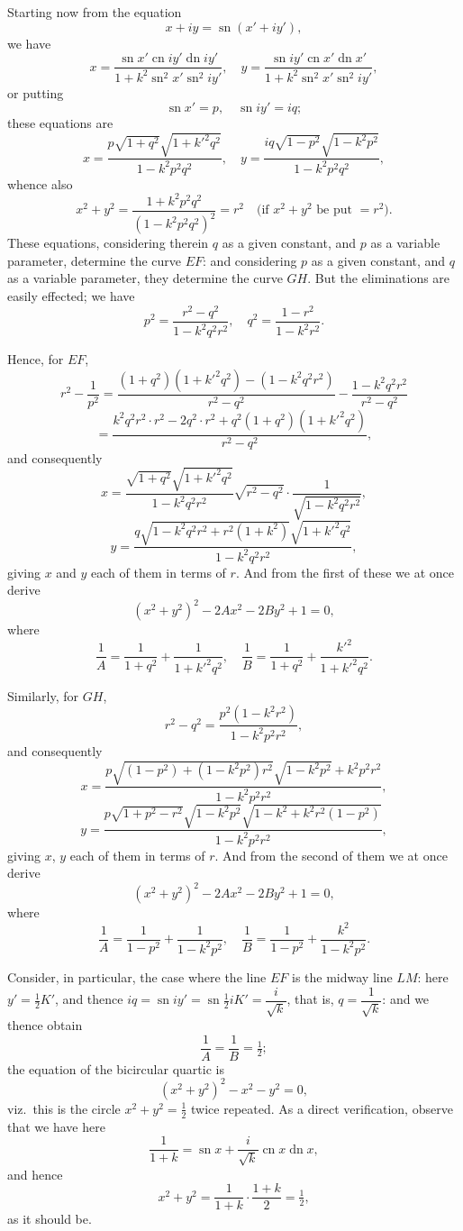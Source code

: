 \documentclass[11pt,a4paper]{article}
\DeclareMathOperator{\sn}{sn}
\DeclareMathOperator{\cn}{cn}
\DeclareMathOperator{\dn}{dn}
\begin{document}
Starting now from the equation
\[
x + iy = \sn(x' + iy'),
\]
we have
\[
x = \frac{\sn x' \cn iy' \dn iy'}{1 + k^2 \sn^2 x' \sn^2 iy'},\quad y = \frac{\sn iy' \cn x' \dn x'}{1 + k^2 \sn^2 x' \sn^2 iy'},
\]
or putting
\[
\sn x' = p,\quad \sn iy' = iq;
\]
these equations are
\[
x = \frac{p\sqrt{1+q^2}\sqrt{1+k'^2q^2}}{1-k^2p^2q^2},\quad y = \frac{iq\sqrt{1-p^2}\sqrt{1-k^2p^2}}{1-k^2p^2q^2},
\]
whence also
\[
x^2 + y^2 = \frac{1+k^2p^2q^2}{(1-k^2p^2q^2)^2} = r^2\quad \text{(if $x^2+y^2$ be put $=r^2$).}
\]
These equations, considering therein $q$ as a given constant, and $p$ as a variable parameter, determine the curve $EF$: and considering $p$ as a given constant, and $q$ as a variable parameter, they determine the curve $GH$. But the eliminations are easily effected; we have
\[
p^2 = \frac{r^2-q^2}{1-k^2q^2r^2},\quad q^2 = \frac{1-r^2}{1-k^2r^2}.
\]

Hence, for $EF$,
\[
r^2 - \frac{1}{p^2} = \frac{(1+q^2)(1+k'^2q^2) - (1-k^2q^2r^2)}{r^2-q^2} - \frac{1-k^2q^2r^2}{r^2-q^2}
\]
\[
= \frac{k^2q^2r^2 \cdot r^2 - 2q^2 \cdot r^2 + q^2(1+q^2)(1+k'^2q^2)}{r^2-q^2},
\]
and consequently
\[
x = \frac{\sqrt{1+q^2}\sqrt{1+k'^2q^2}}{1-k^2q^2r^2}\sqrt{r^2-q^2} \cdot \frac{1}{\sqrt{1-k^2q^2r^2}},
\]
\[
y = \frac{q\sqrt{1-k^2q^2r^2 + r^2(1+k^2)}\sqrt{1+k'^2q^2}}{1-k^2q^2r^2},
\]
giving $x$ and $y$ each of them in terms of $r$. And from the first of these we at once derive
\[
(x^2+y^2)^2 - 2Ax^2 - 2By^2 + 1 = 0,
\]
where
\[
\frac{1}{A} = \frac{1}{1+q^2} + \frac{1}{1+k'^2q^2},\quad \frac{1}{B} = \frac{1}{1+q^2} + \frac{k'^2}{1+k'^2q^2}.
\]

Similarly, for $GH$,
\[
r^2 - q^2 = \frac{p^2(1-k^2r^2)}{1-k^2p^2r^2},
\]
and consequently
\[
x = \frac{p\sqrt{(1-p^2)+(1-k^2p^2)r^2}\sqrt{1-k^2p^2}+k^2p^2r^2}{1-k^2p^2r^2},
\]
\[
y = \frac{p\sqrt{1+p^2-r^2}\sqrt{1-k^2p^2}\sqrt{1-k^2+k^2r^2(1-p^2)}}{1-k^2p^2r^2},
\]
giving $x$, $y$ each of them in terms of $r$. And from the second of them we at once derive
\[
(x^2+y^2)^2 - 2Ax^2 - 2By^2 + 1 = 0,
\]
where
\[
\frac{1}{A} = \frac{1}{1-p^2} + \frac{1}{1-k^2p^2},\quad \frac{1}{B} = \frac{1}{1-p^2} + \frac{k^2}{1-k^2p^2}.
\]

Consider, in particular, the case where the line $EF$ is the midway line $LM$: here $y' = \tfrac{1}{2}K'$, and thence $iq = \sn iy' = \sn \tfrac{1}{2}iK' = \dfrac{i}{\sqrt{k}}$, that is, $q = \dfrac{1}{\sqrt{k}}$: and we thence obtain
\[
\frac{1}{A} = \frac{1}{B} = \tfrac{1}{2};
\]
the equation of the bicircular quartic is
\[
(x^2+y^2)^2 - x^2 - y^2 = 0,
\]
viz.\ this is the circle $x^2+y^2 = \tfrac{1}{2}$ twice repeated. As a direct verification, observe that we have here
\[
\frac{1}{1+k} = \sn x + \frac{i}{\sqrt{k}} \cn x \dn x,
\]
and hence
\[
x^2 + y^2 = \frac{1}{1+k}\cdot\frac{1+k}{2} = \tfrac{1}{2},
\]
as it should be.
\end{document}
